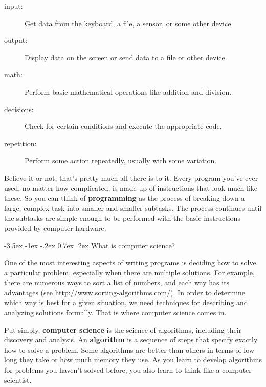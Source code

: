 \documentclass[12pt]{book}
\makeatletter
\renewcommand{\section}{\@startsection {section}{1}{\z@}%
    {-3.5ex \@plus -1ex \@minus -.2ex}%
    {0.7ex \@plus.2ex}%
    {\normalfont\Large\bfseries}}
\theoremstyle{exercise}
\makeatother
\begin{document}
\begin{description}
\item[input:] Get data from the keyboard, a file, a sensor, or some other device.
\item[output:] Display data on the screen or send data to a file or other device.
\item[math:] Perform basic mathematical operations like addition and division.
\item[decisions:] Check for certain conditions and execute the appropriate code.
\item[repetition:] Perform some action repeatedly, usually with some variation.
\end{description}


Believe it or not, that's pretty much all there is to it.
Every program you've ever used, no matter how complicated, is made up of instructions that look much like these.
So you can think of {\bf programming} as the process of breaking down a large, complex task into smaller and smaller subtasks.
The process continues until the subtasks are simple enough to be performed with the basic instructions provided by computer hardware.


\section{What is computer science?}

One of the most interesting aspects of writing programs is deciding how to solve a particular problem, especially when there are multiple solutions.
For example, there are numerous ways to sort a list of numbers, and each way has its advantages (see \url{http://www.sorting-algorithms.com/}).
In order to determine which way is best for a given situation, we need techniques for describing and analyzing solutions formally.
That is where computer science comes in.


Put simply, {\bf computer science} is the science of algorithms, including their discovery and analysis.
An {\bf algorithm} is a sequence of steps that specify exactly how to solve a problem.
Some algorithms are better than others in terms of low long they take or how much memory they use.
As you learn to develop algorithms for problems you haven't solved before, you also learn to think like a computer scientist.
\end{document}

